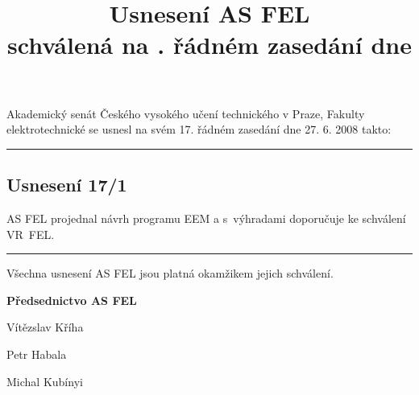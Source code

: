 \documentclass[a4paper,12pt,notitlepage]{article}
\title{Usnesení AS FEL\\schválená na \cislo. řádném zasedání dne \datum}
\author{}\date{}
\newcommand{\cislo}{17}
\newcommand{\datum}{27. 6. 2008 }
\newcommand{\hr}{\bigskip\hrule\bigskip}
\newcommand{\usneseni}[3]{
\subsection*{#1}

#2

}
\begin{document}
\maketitle
\thispagestyle{empty}


Akademický senát Českého vysokého učení technického v Praze, Fakulty
elektrotechnické se usnesl na svém \cislo. řádném zasedání dne \datum takto:\hr

\usneseni{Usnesení \cislo/1}{AS FEL projednal návrh programu EEM a s~výhradami doporučuje
ke schválení VR~FEL.}




\bigskip\hr
Všechna usnesení AS FEL jsou platná okamžikem jejich schválení.

\bigskip
\begin{center}
\textbf{Předsednictvo AS FEL}

Vítězslav Kříha

Petr Habala

Michal Kubínyi
\end{center}
\end{document}
